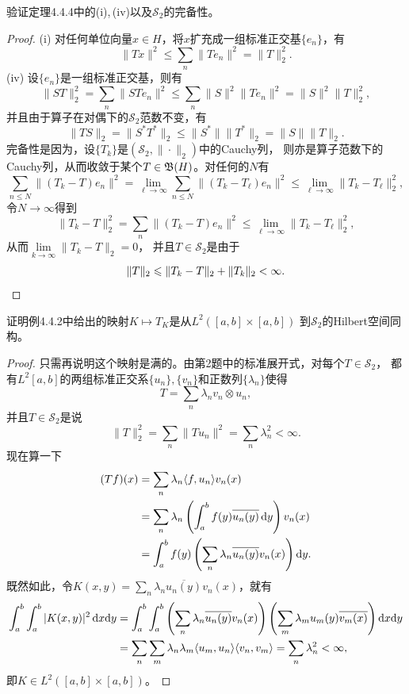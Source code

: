 \begin{3}
    验证定理4.4.4中的(i),\,(iv)以及$\mathcal{S}_2$的完备性。
\end{3}
\begin{proof}
    (i) 对任何单位向量$x \in H$，将$x$扩充成一组标准正交基$\{e_n\}$，有
    \[\|Tx\|^2\leqslant\sum_n\|Te_n\|^2=\|T\|_2^2.\]
    (iv) 设$\{e_n\}$是一组标准正交基，则有
    \[\|ST\|_2^2=\sum_n\|STe_n\|^2\leqslant\sum_n\|S\|^2\|Te_n\|^2=\|S\|^2\|T\|_2^2,\]
    并且由于算子在对偶下的$\mathcal{S}_2$范数不变，有
    \[\|TS\|_2=\|S^*T^*\|_2\leqslant\|S^*\|\|T^*\|_2=\|S\|\|T\|_2.\]
    完备性是因为，设$\{T_k\}$是$(\mathcal{S}_2,\|\cdot\|_2)$中的Cauchy列，
    则亦是算子范数下的Cauchy列，从而收敛于某个$T\in\mathfrak{B}(H)$。对任何的$N$有
    \[\sum_{n \leqslant N}\|(T_k-T)e_n\|^2
    =\lim_{\ell\to\infty}\sum_{n \leqslant N}\|(T_k-T_\ell)e_n\|^2
    \leqslant\lim_{\ell\to\infty}\|T_k-T_\ell\|_2^2,\]
    令$N\to\infty$得到
    \[\|T_k-T\|_2^2=\sum_n\|(T_k-T)e_n\|^2
    \leqslant\lim_{\ell\to\infty}\|T_k-T_\ell\|_2^2,\]
    从而$\lim\limits_{k\to\infty}\|T_k-T\|_2=0$，
    并且$T\in\mathcal{S}_2$是由于
    \[\|T\|_2\leqslant\|T_k-T\|_2+\|T_k\|_2<\infty.\qedhere\]
\end{proof}

\begin{4}
    证明例4.4.2中给出的映射$K \mapsto T_K$是从$L^2([a,b]\times[a,b])$
    到$\mathcal{S}_2$的Hilbert空间同构。
\end{4}
\begin{proof}
    只需再说明这个映射是满的。由第2题中的标准展开式，对每个$T\in\mathcal{S}_2$，
    都有$L^2[a,b]$的两组标准正交系$\{u_n\},\{v_n\}$和正数列$\{\lambda_n\}$使得
    \[T=\sum_n \lambda_n v_n \otimes u_n,\]
    并且$T\in\mathcal{S}_2$是说
    \[\|T\|_2^2=\sum_n\|Tu_n\|^2=\sum_n\lambda_n^2<\infty.\]
    现在算一下
    \begin{align*}
        (Tf)(x)&=\sum_n\lambda_n\langle f,u_n \rangle v_n(x)\\
        &=\sum_n\lambda_n\left(\int_a^bf(y)\overline{u_n(y)}\,{\rm d}y\right)v_n(x)\\
        &=\int_a^bf(y)\left(\sum_n\lambda_n\overline{u_n(y)}v_n(x)\right){\rm d}y.
    \end{align*}
    既然如此，令$\displaystyle K(x,y)=\sum_n\lambda_n\overline{u_n(y)}v_n(x)$，就有
    \begin{align*}
        \int_a^b\int_a^b|K(x,y)|^2\,{\rm d}x{\rm d}y
        &=\int_a^b\int_a^b\left(\sum_n\lambda_n\overline{u_n(y)}v_n(x)\right)
        \left(\sum_m\lambda_mu_m(y)\overline{v_m(x)}\right){\rm d}x{\rm d}y\\
        &=\sum_n\sum_m\lambda_n\lambda_m\langle u_m,u_n \rangle\langle v_n,v_m \rangle
        =\sum_n\lambda_n^2<\infty,
    \end{align*}
    即$K \in L^2([a,b]\times[a,b])$。
\end{proof}

